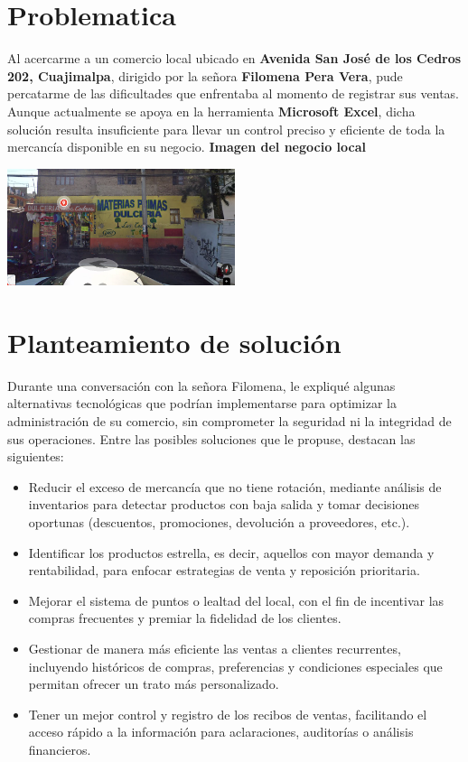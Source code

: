 \section*{\centering Problematica}

Al acercarme a un comercio local ubicado en 
\textbf{Avenida San José de los Cedros 202, Cuajimalpa}, dirigido por la señora \textbf{Filomena Pera Vera}, 
pude percatarme de las dificultades que enfrentaba al momento de registrar sus ventas. Aunque actualmente se apoya en la herramienta 
\textbf{Microsoft Excel}, dicha solución resulta insuficiente para llevar un control preciso y eficiente de toda la mercancía disponible en su negocio.
\newline
\textbf{Imagen del negocio local}
\begin{center}
\includegraphics[width=0.5\textwidth]{imagenes/ubi.png}\par
\end{center}

\section*{Planteamiento de solución}
Durante una conversación con la señora Filomena, le expliqué algunas alternativas tecnológicas que podrían implementarse 
para optimizar la administración de su comercio, sin comprometer la seguridad ni la integridad de sus operaciones. 
Entre las posibles soluciones que le propuse, destacan las siguientes:

\begin{itemize}
    \item Reducir el exceso de mercancía que no tiene rotación, mediante análisis de inventarios para detectar productos con baja salida y tomar decisiones oportunas 
    (descuentos, promociones, devolución a proveedores, etc.).
    \item Identificar los productos estrella, es decir, aquellos con mayor demanda y rentabilidad, 
    para enfocar estrategias de venta y reposición prioritaria.
    \item Mejorar el sistema de puntos o lealtad del local, con el fin de incentivar las compras frecuentes y 
    premiar la fidelidad de los clientes.
    \item Gestionar de manera más eficiente las ventas a clientes recurrentes, incluyendo históricos de compras, preferencias y 
    condiciones especiales que permitan ofrecer un trato más personalizado.
    \item Tener un mejor control y registro de los recibos de ventas, facilitando el acceso rápido a la información para aclaraciones, 
    auditorías o análisis financieros.
\end{itemize}

